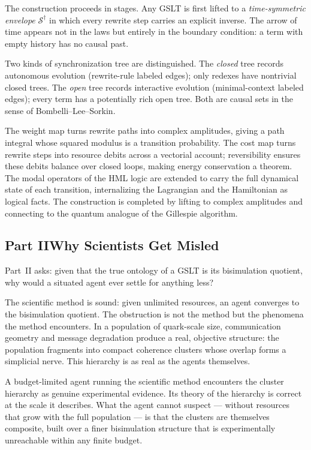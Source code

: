 \documentclass[12pt]{article}
\theoremstyle{remark}
\newcommand{\GSLT}{\mathcal{S}}
\begin{document}
The construction proceeds in stages.
Any GSLT is first lifted to a \emph{time-symmetric envelope}
$\GSLT^\dagger$ in which every rewrite step carries an explicit
inverse.
The arrow of time appears not in the laws but entirely in the
boundary condition: a term with empty history has no causal past.

Two kinds of synchronization tree are distinguished.
The \emph{closed} tree records autonomous evolution (rewrite-rule
labeled edges); only redexes have nontrivial closed trees.
The \emph{open} tree records interactive evolution (minimal-context
labeled edges); every term has a potentially rich open tree.
Both are causal sets in the sense of Bombelli--Lee--Sorkin.

The weight map turns rewrite paths into complex amplitudes,
giving a path integral whose squared modulus is a transition
probability.
The cost map turns rewrite steps into resource debits across a
vectorial account; reversibility ensures these debits balance
over closed loops, making energy conservation a theorem.
The modal operators of the HML logic are extended to carry the full
dynamical state of each transition, internalizing the Lagrangian
and the Hamiltonian as logical facts.
The construction is completed by lifting to complex amplitudes and
connecting to the quantum analogue of the Gillespie algorithm.

\bigskip

\subsection*{Part II\quad Why Scientists Get Misled}

Part~II asks: given that the true ontology of a GSLT is its
bisimulation quotient, why would a situated agent ever settle
for anything less?

The scientific method is sound: given unlimited resources, an
agent converges to the bisimulation quotient.
The obstruction is not the method but the phenomena the method
encounters.
In a population of quark-scale size, communication geometry and
message degradation produce a real, objective structure: the
population fragments into compact coherence clusters whose overlap
forms a simplicial nerve.
This hierarchy is as real as the agents themselves.

A budget-limited agent running the scientific method encounters
the cluster hierarchy as genuine experimental evidence.
Its theory of the hierarchy is correct at the scale it describes.
What the agent cannot suspect --- without resources that grow with
the full population --- is that the clusters are themselves
composite, built over a finer bisimulation structure that is
experimentally unreachable within any finite budget.
\end{document}
